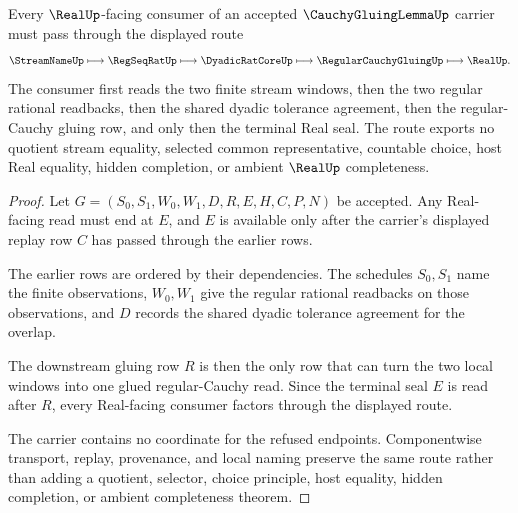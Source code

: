 \begin{theorem}
\label{thm:cauchy-gluing-lemma-real-seal-handoff}
Every $\RealUp$-facing consumer of an accepted $\CauchyGluingLemmaUp$ carrier must pass through the displayed route
$$
\StreamNameUp \longmapsto \RegSeqRatUp \longmapsto \DyadicRatCoreUp \longmapsto \RegularCauchyGluingUp \longmapsto \RealUp .
$$
The consumer first reads the two finite stream windows, then the two regular rational readbacks, then the shared dyadic tolerance agreement, then the regular-Cauchy gluing row, and only then the terminal Real seal. The route exports no quotient stream equality, selected common representative, countable choice, host Real equality, hidden completion, or ambient $\RealUp$ completeness.
\end{theorem}
\begin{proof}
Let $G=(S_0,S_1,W_0,W_1,D,R,E,H,C,P,N)$ be accepted. Any Real-facing read must end at $E$, and $E$ is available only after the carrier's displayed replay row $C$ has passed through the earlier rows.

The earlier rows are ordered by their dependencies. The schedules $S_0,S_1$ name the finite observations, $W_0,W_1$ give the regular rational readbacks on those observations, and $D$ records the shared dyadic tolerance agreement for the overlap.

The downstream gluing row $R$ is then the only row that can turn the two local windows into one glued regular-Cauchy read. Since the terminal seal $E$ is read after $R$, every Real-facing consumer factors through the displayed route.

The carrier contains no coordinate for the refused endpoints. Componentwise transport, replay, provenance, and local naming preserve the same route rather than adding a quotient, selector, choice principle, host equality, hidden completion, or ambient completeness theorem.
\end{proof}



